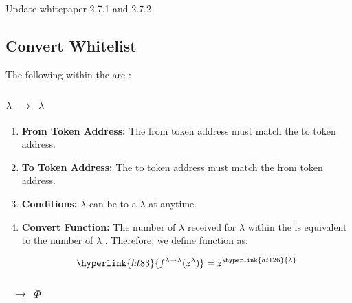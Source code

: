 Update whitepaper 2.7.1 and 2.7.2\documentclass[class=article, crop=false]{standalone}
\begin{document}

\subsection{Convert Whitelist} 

The following  within the  are :

\subsubsection{$\lambda$ $\rightarrow$ $\lambda$}

\begin{enumerate}
    \item \textbf{From Token Address:} The from token address must match the to token address.
    
    \item \textbf{To Token Address:} The to token address must match the from token address.
    
    \item \textbf{Conditions:}  \hyperlink{ht126}{$\lambda$} can be  to a \hyperlink{ht126}{$\lambda$}  at anytime. 
    
    \item \textbf{Convert Function:} The number of \hyperlink{ht126}{$\lambda$} received for   \hyperlink{ht126}{$\lambda$} within the  is equivalent to the number of \hyperlink{ht126}{$\lambda$} . Therefore, we define function as:
    
        $$
            \hyperlink{ht83}{f^{\lambda \rightarrow \lambda}(z^{\lambda})} = 
                z^{\hyperlink{ht126}{\lambda}}
        $$

\end{enumerate}

\subsubsection{\Bean\ $\rightarrow$ $\Phi$}
\end{document}

